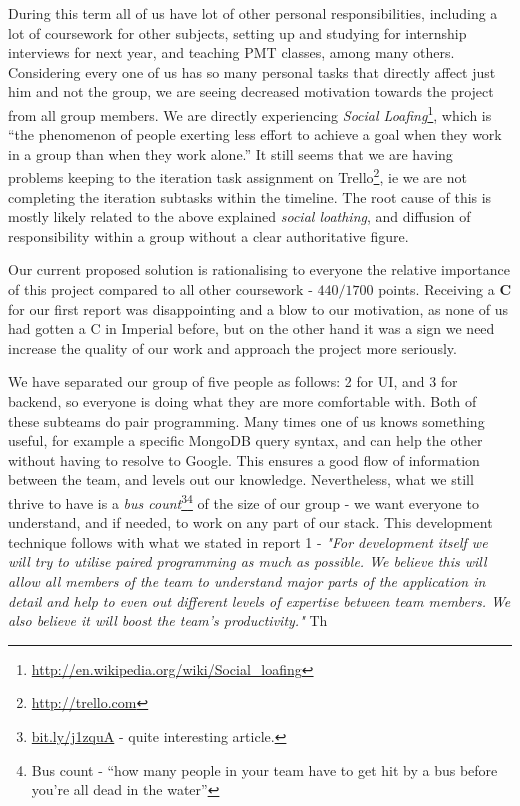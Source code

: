 \documentclass[a4paper,12pt]{article}
\begin{document}
	During this term all of us have lot of other personal responsibilities, including a lot of coursework for other subjects, setting up and studying for internship interviews for next year, and teaching PMT classes, among many others. Considering every one of us has so many personal tasks that directly affect just him and not the group, we are seeing decreased motivation towards the project from all group members. We are directly experiencing \emph{Social Loafing}\footnote{\url{http://en.wikipedia.org/wiki/Social_loafing}}, which is ``the phenomenon of people exerting less effort to achieve a goal when they work in a group than when they work alone.'' It still seems that we are having problems keeping to the iteration task assignment on Trello\footnote{\url{http://trello.com}}, ie we are not completing the iteration subtasks within the timeline. The root cause of this is mostly likely related to the above explained \emph{social loathing}, and diffusion of responsibility within a group without a clear authoritative figure.
	
	Our current proposed solution is rationalising to everyone the relative importance of this project compared to all other coursework - $440/1700$ points. Receiving a \textbf{C} for our first report was disappointing and a blow to our motivation, as none of us had gotten a C in Imperial before, but on the other hand it was a sign we need increase the quality of our work and approach the project more seriously.
	
	We have separated our group of five people as follows: 2 for UI, and 3 for backend, so everyone is doing what they are more comfortable with. Both of these subteams do pair programming. Many times one of us knows something useful, for example a specific MongoDB query syntax, and can help the other without having to resolve to Google. This ensures a good flow of information between the team, and levels out our knowledge. Nevertheless, what we still thrive to have is a \emph{bus count}\footnote{\url{bit.ly/j1zquA} - quite interesting article.}\footnote{Bus count - ``how many people in your team have to get hit by a bus before you’re all dead in the water''} of the size of our group - we want everyone to understand, and if needed, to work on any part of our stack. This development technique follows with what we stated in report 1 - \emph{"For development itself we will try to utilise \emph{paired programming} as much as possible. We believe this will allow all members of the team to understand major parts of the application in detail and help to even out different levels of expertise between team members. We also believe it will boost the team's productivity."} Th
	
\end{document}
